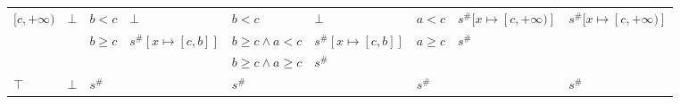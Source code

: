 \documentclass{article}
\begin{document}
\begin{table}[]
\begin{tabular}{|l|l|ll|ll|ll|l|}
\multirow{3}{*}{$[c, +\infty)$} & \multirow{3}{*}{$\bot$} & $b < c$                    & $\bot$                                    & $b < c$                 & $\bot$                   & $a < c$                    & $s^\#[x \mapsto [c, +\infty)]$ & \multirow{3}{*}{$s^\#[x \mapsto [c, +\infty)]$} \\
                                &                         & \multirow{2}{*}{$b \ge c$} & \multirow{2}{*}{$s^\#[x \mapsto [c, b]]$} & $b \ge c \land a < c$   & $s^\#[x \mapsto [c, b]]$ & \multirow{2}{*}{$a \ge c$} & \multirow{2}{*}{$s^\#$}        &                                                 \\
                                &                         &                            &                                           & $b \ge c \land a \ge c$ & $s^\#$                   &                            &                                &                                                 \\ \hline
$\top$                          & $\bot$                  & \multicolumn{2}{l|}{$s^\#$}                                            & \multicolumn{2}{l|}{$s^\#$}                        & \multicolumn{2}{l|}{$s^\#$}                                 & $s^\#$                                          \\ \hline
\end{tabular}
\end{table}
\end{document}
